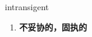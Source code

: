 
\begin{frame}
{\huge intransigent}
\begin{center}
\begin{enumerate}\Large
  \item \textbf{不妥协的，固执的}
\end{enumerate}
\end{center}
\end{frame}
